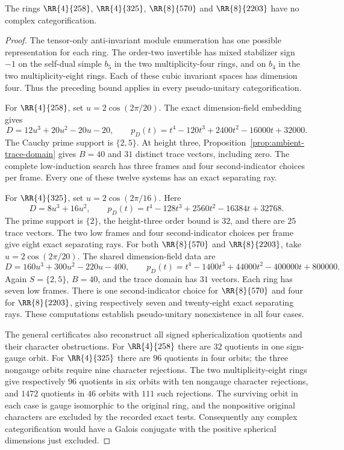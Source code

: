 \begin{theorem}
\label{thm:quartic-stabilizer}
The rings $\RR{4}{258}$, $\RR{4}{325}$, $\RR{8}{570}$ and
$\RR{8}{2203}$ have no complex
categorification.
\end{theorem}
\begin{proof}
The tensor-only anti-invariant module enumeration has one possible
representation for each ring. The order-two invertible has mixed
stabilizer sign $-1$ on the self-dual simple $b_5$ in the two
multiplicity-four rings, and on $b_4$ in the two multiplicity-eight
rings. Each of these cubic invariant spaces has dimension four.
Thus the preceding bound applies in every
pseudo-unitary categorification.

For $\RR{4}{258}$, set $u=2\cos(2\pi/20)$. The exact dimension-field
embedding gives
\[
 D=12u^3+20u^2-20u-20,\qquad
 p_D(t)=t^4-120t^3+2400t^2-16000t+32000.
\]
The Cauchy prime support is $\{2,5\}$. At height three,
Proposition~\ref{prop:ambient-trace-domain} gives $B=40$ and $31$
distinct trace vectors, including zero. The complete low-induction
search has three frames and four second-indicator choices per frame.
Every one of these twelve systems has an exact separating ray.

For $\RR{4}{325}$, set $u=2\cos(2\pi/16)$. Here
\[
 D=8u^3+16u^2,\qquad
 p_D(t)=t^4-128t^3+2560t^2-16384t+32768.
\]
The prime support is $\{2\}$, the height-three order bound is $32$,
and there are $25$ trace vectors. The two low frames and four
second-indicator choices per frame give eight exact separating rays.
For both $\RR{8}{570}$ and $\RR{8}{2203}$, take
$u=2\cos(2\pi/20)$. The shared dimension-field data are
\[
 D=160u^3+300u^2-220u-400,\qquad
 p_D(t)=t^4-1400t^3+44000t^2-400000t+800000.
\]
Again $S=\{2,5\}$, $B=40$, and the trace domain has $31$ vectors.
Each ring has seven low frames. There is one second-indicator choice
for $\RR{8}{570}$ and four for $\RR{8}{2203}$, giving respectively
seven and twenty-eight exact separating rays.
These computations establish pseudo-unitary nonexistence in all four
cases.

The general certificates also reconstruct all signed sphericalization
quotients and their character obstructions. For $\RR{4}{258}$ there
are $32$ quotients in one sign-gauge orbit. For $\RR{4}{325}$ there are
$96$ quotients in four orbits; the three nongauge orbits require nine
character rejections. The two multiplicity-eight rings give
respectively $96$ quotients in six orbits with ten nongauge character
rejections, and $1472$ quotients in $46$ orbits with $111$ such
rejections. The surviving orbit in each case is gauge
isomorphic to the original ring, and the nonpositive original
characters are excluded by the recorded exact tests. Consequently any
complex categorification would have a Galois conjugate with the
positive spherical dimensions just excluded.


\end{proof}
